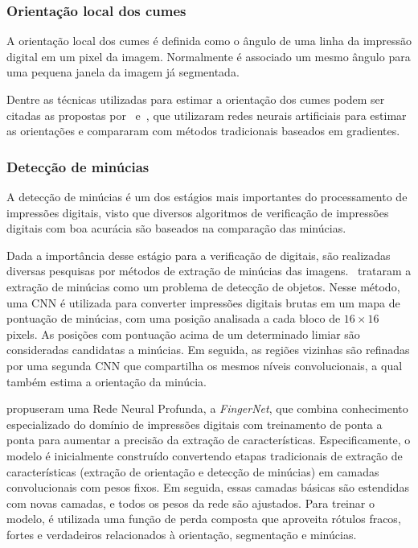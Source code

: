 \subsubsection{Orientação local dos cumes}\label{subsubsec:orientacao}

A orientação local dos cumes é definida como o ângulo de uma linha da impressão digital em um pixel da imagem. Normalmente é associado um mesmo ângulo para uma pequena janela da imagem já segmentada.

Dentre as técnicas utilizadas para estimar a orientação dos cumes podem ser citadas as propostas por~ e~, que utilizaram redes neurais artificiais para estimar as orientações e compararam com métodos tradicionais baseados em gradientes.

\subsubsection{Detecção de minúcias}\label{subsubsec:minucias}

A detecção de minúcias é um dos estágios mais importantes do processamento de impressões digitais, visto que diversos algoritmos de verificação de impressões digitais com boa acurácia são baseados na comparação das minúcias.

Dada a importância desse estágio para a verificação de digitais, são realizadas diversas pesquisas por métodos de extração de minúcias das imagens.~ trataram a extração de minúcias como um problema de detecção de objetos. Nesse método, uma CNN é utilizada para converter impressões digitais brutas em um mapa de pontuação de minúcias, com uma posição analisada a cada bloco de $16 \times 16$ pixels. As posições com pontuação acima de um determinado limiar são consideradas candidatas a minúcias. Em seguida, as regiões vizinhas são refinadas por uma segunda CNN que compartilha os mesmos níveis convolucionais, a qual também estima a orientação da minúcia.

 propuseram uma Rede Neural Profunda, a \textit{FingerNet}, que combina conhecimento especializado do domínio de impressões digitais com treinamento de ponta a ponta para aumentar a precisão da extração de características. Especificamente, o modelo é inicialmente construído convertendo etapas tradicionais de extração de características (extração de orientação e detecção de minúcias) em camadas convolucionais com pesos fixos. Em seguida, essas camadas básicas são estendidas com novas camadas, e todos os pesos da rede são ajustados. Para treinar o modelo, é utilizada uma função de perda composta que aproveita rótulos fracos, fortes e verdadeiros relacionados à orientação, segmentação e minúcias.

